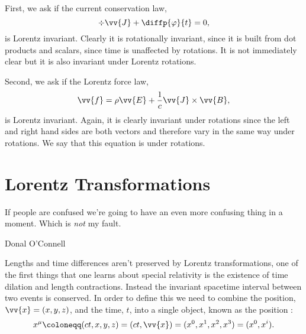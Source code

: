 First, we ask if the current conservation law,
\begin{equation}
    \div\vv{J} + \diffp{\varphi}{t} = 0,
\end{equation}
is Lorentz invariant.
Clearly it is rotationally invariant, since it is built from dot products and scalars, since time is unaffected by rotations.
It is not immediately clear but it is also invariant under Lorentz rotations.

Second, we ask if the Lorentz force law,
\begin{equation}
    \vv{f} = \rho\vv{E} + \frac{1}{c}\vv{J}\times\vv{B},
\end{equation}
is Lorentz invariant.
Again, it is clearly invariant under rotations since the left and right hand sides are both vectors and therefore vary in the same way under rotations.
We say that this equation is  under rotations.

\section{Lorentz Transformations}
\epigraph{If people are confused we're going to have an even more confusing thing in a moment. Which is \emph{not} my fault.}{Donal O'Connell}
Lengths and time differences aren't preserved by Lorentz transformations, one of the first things that one learns about special relativity is the existence of time dilation and length contractions.
Instead the invariant spacetime interval between two events is conserved.
In order to define this we need to combine the position, \(\vv{x} = (x, y, z)\), and the time, \(t\), into a single object, known as the position :
\begin{equation}
    x^\mu \coloneqq (ct, x, y, z) = (ct, \vv{x}) = (x^0, x^1, x^2, x^3) = (x^0, x^i).
\end{equation}

